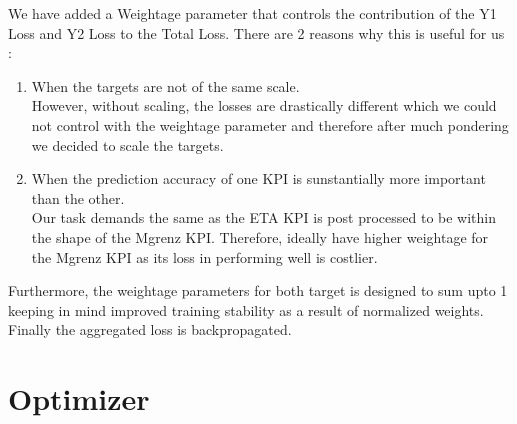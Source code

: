 \documentclass{report} %
\begin{document}

\vspace{0.2cm} %

We have added a Weightage parameter that controls the contribution of the Y1 Loss and Y2 Loss to the Total Loss. There are 2 reasons why this is useful for us :\\
\begin{enumerate}
    \item  When the targets are not of the same scale. \\
    However, without scaling, the losses are drastically different which we could not control with the weightage parameter and therefore after much pondering we decided to scale the targets.
    \item When the prediction accuracy of one \ac{KPI} is sunstantially more important than the other. \\
    Our task demands the same as the ETA \ac{KPI} is post processed to be within the shape of the Mgrenz \ac{KPI}. 
    Therefore, ideally have higher weightage for the Mgrenz \ac{KPI} as its loss in performing well is costlier.
\end{enumerate}
Furthermore, the weightage parameters for both target is designed to sum upto 1 keeping in mind improved training stability as a result of normalized weights. \\

Finally the aggregated loss is backpropagated.\\
\vspace{0.2cm} %

\section{Optimizer}\label{sec:Optimizer}
\end{document}
